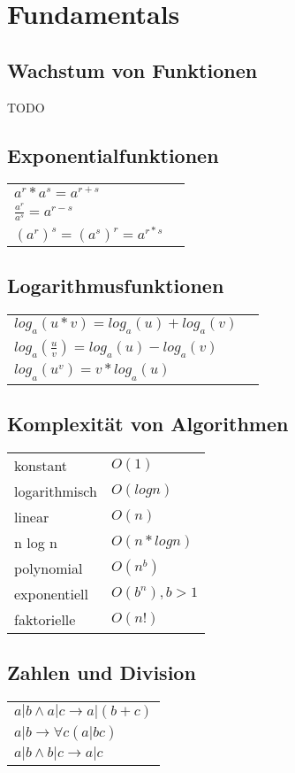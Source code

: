\section{Fundamentals}

\subsection{Wachstum von Funktionen}
TODO

\subsection{Exponentialfunktionen}
\begin{tabular}{ll}
    $ a^r * a^s = a^{r+s} $ \\
    $ \frac{a^r}{a^s} = a^{r-s} $ \\
    $ (a^r)^s = (a^s)^r = a^{r*s} $ \\
\end{tabular}

\subsection{Logarithmusfunktionen}
\begin{tabular}{ll}
    $ log_a(u * v) = log_a(u) + log_a(v) $ \\
    $ log_a(\frac{u}{v}) = log_a(u) - log_a(v) $ \\
    $ log_a(u^v) = v * log_a(u) $ \\
\end{tabular}

\subsection{Komplexität von Algorithmen}
\begin{tabular}{ll}
    konstant & $ O(1) $ \\
    logarithmisch & $ O(log n) $ \\ 
    linear & $ O(n) $ \\
    n log n & $ O(n * log n) $ \\
    polynomial & $ O(n^b) $ \\
    exponentiell & $ O(b^n), b > 1$ \\
    faktorielle & $ O(n!) $ \\
\end{tabular}

\subsection{Zahlen und Division}
\begin{tabular}{l}
    $ a|b \land a|c \rightarrow a|(b + c) $ \\
    $ a|b \rightarrow \forall c(a|bc) $ \\
    $ a|b \land b|c \rightarrow a|c $ \\
\end{tabular}

